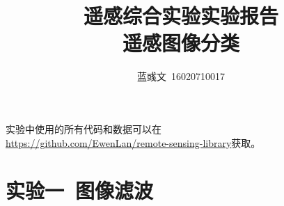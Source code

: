 \documentclass[hyperref, UTF8]{ctexart}
\title{遥感综合实验实验报告\\遥感图像分类}
\author{蓝彧文~16020710017}
\begin{document}
	\maketitle
	\tableofcontents
	\newpage
	实验中使用的所有代码和数据可以在\\ \url{https://github.com/EwenLan/remote-sensing-library}获取。
	\section{实验一~图像滤波}
	
\end{document}
